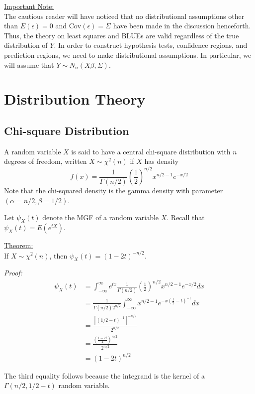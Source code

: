 \documentclass[12pt]{article}
\newcommand{\Cov}{\mathrm{Cov}}
\numberwithin{equation}{section}
\begin{document}
\underline{Important Note:}\\
The cautious reader will have noticed that no distributional assumptions other than $E(\epsilon) = 0$ and $\Cov(\epsilon) = \Sigma$ have been made in the discussion henceforth. Thus, the theory on least squares and BLUEs are valid regardless of the true distribution of $Y$. In order to construct hypothesis tests, confidence regions, and prediction regions, we need to make distributional assumptions. In particular, we will assume that $Y \sim N_n(X\beta, \Sigma)$.

\section{Distribution Theory}
\subsection{Chi-square Distribution}
A random variable $X$ is said to have a central chi-square distribution with $n$ degrees of freedom, written $X \sim \chi^2(n)$ if $X$ has density
\begin{equation*}
  f(x) = \frac{1}{\Gamma(n/2)} (\frac{1}{2})^{n/2} x^{n/2 - 1} e^{-x/2}
\end{equation*}
Note that the chi-squared density is the gamma density with parameter $(\alpha = n/2, \beta = 1/2)$.

Let $\psi_X(t)$ denote the MGF of a random variable $X$. Recall that $\psi_X(t) = E(e^{tX})$. 

\underline{Theorem:} \\
If $X \sim \chi^2(n)$, then $\psi_X(t) = (1 - 2t)^{-n/2}$.

\textit{Proof:} \\
\begin{align*}
  \psi_X(t) &= \int_{-\infty}^{\infty} e^{tx} \frac{1}{\Gamma(n/2)} (\frac{1}{2})^{n/2} x^{n/2 - 1} e^{-x/2} dx \\
  &= \frac{1}{\Gamma(n/2) 2^{n/2}} \int_{-\infty}^{\infty}
  x^{n/2 - 1} e^{-x(\frac{1}{2} - t)^{-1}} dx \\
  &= \frac{[(1/2 - t)^{-1}]^{-n/2}}{2^{n/2}} \\
  &= \frac{(\frac{1 - 2t}{2})^{n/2}}{2^{n/2}} \\
  &= (1 - 2t)^{n/2}
\end{align*}

The third equality follows because the integrand is the kernel of a $\Gamma(n/2, 1/2 - t)$ random variable.
\end{document}
